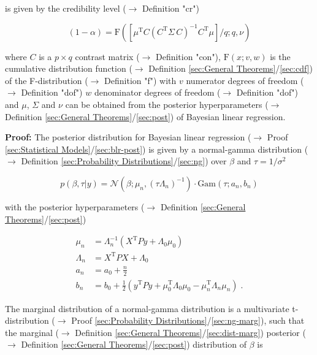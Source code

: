 \documentclass[a4paper,12pt,twoside]{book}
\begin{document}
is given by the credibility level ($\rightarrow$ Definition "cr")

\begin{equation} \label{eq:blr-pcr-GLM-NG-PCR}
(1-\alpha) = \mathrm{F}\left( \left[ \mu^\mathrm{T} C (C^\mathrm{T} \Sigma \, C)^{-1} C^\mathrm{T} \mu \right]/q; q, \nu \right)
\end{equation}

where $C$ is a $p \times q$ contrast matrix ($\rightarrow$ Definition "con"), $\mathrm{F}(x; v, w)$ is the cumulative distribution function ($\rightarrow$ Definition \ref{sec:General Theorems}/\ref{sec:cdf}) of the F-distribution ($\rightarrow$ Definition "f") with $v$ numerator degrees of freedom ($\rightarrow$ Definition "dof") $w$ denominator degrees of freedom ($\rightarrow$ Definition "dof") and $\mu$, $\Sigma$ and $\nu$ can be obtained from the posterior hyperparameters ($\rightarrow$ Definition \ref{sec:General Theorems}/\ref{sec:post}) of Bayesian linear regression.


\vspace{1em}
\textbf{Proof:} The posterior distribution for Bayesian linear regression ($\rightarrow$ Proof \ref{sec:Statistical Models}/\ref{sec:blr-post}) is given by a normal-gamma distribution ($\rightarrow$ Definition \ref{sec:Probability Distributions}/\ref{sec:ng}) over $\beta$ and $\tau = 1/\sigma^2$

\begin{equation} \label{eq:blr-pcr-GLM-NG-post}
p(\beta,\tau|y) = \mathcal{N}(\beta; \mu_n, (\tau \Lambda_n)^{-1}) \cdot \mathrm{Gam}(\tau; a_n, b_n)
\end{equation}

with the posterior hyperparameters ($\rightarrow$ Definition \ref{sec:General Theorems}/\ref{sec:post})

\begin{equation} \label{eq:blr-pcr-GLM-NG-post-par}
\begin{split}
\mu_n &= \Lambda_n^{-1} (X^\mathrm{T} P y + \Lambda_0 \mu_0) \\
\Lambda_n &= X^\mathrm{T} P X + \Lambda_0 \\
a_n &= a_0 + \frac{n}{2} \\
b_n &= b_0 + \frac{1}{2} (y^\mathrm{T} P y + \mu_0^\mathrm{T} \Lambda_0 \mu_0 - \mu_n^\mathrm{T} \Lambda_n \mu_n) \; .
\end{split}
\end{equation}

The marginal distribution of a normal-gamma distribution is a multivariate t-distribution ($\rightarrow$ Proof \ref{sec:Probability Distributions}/\ref{sec:ng-marg}), such that the marginal ($\rightarrow$ Definition \ref{sec:General Theorems}/\ref{sec:dist-marg}) posterior ($\rightarrow$ Definition \ref{sec:General Theorems}/\ref{sec:post}) distribution of $\beta$ is
\end{document}
